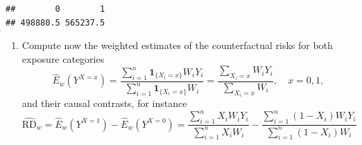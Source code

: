 \documentclass[
]{book}
\newenvironment{Shaded}{\begin{snugshade}}{\end{snugshade}}
\newcommand{\DecValTok}[1]{\textcolor[rgb]{0.00,0.00,0.81}{#1}}
\newcommand{\FunctionTok}[1]{\textcolor[rgb]{0.13,0.29,0.53}{\textbf{#1}}}
\newcommand{\NormalTok}[1]{#1}
\newcommand{\OtherTok}[1]{\textcolor[rgb]{0.56,0.35,0.01}{#1}}
\newcommand{\SpecialCharTok}[1]{\textcolor[rgb]{0.81,0.36,0.00}{\textbf{#1}}}
\providecommand{\tightlist}{%
  \setlength{\itemsep}{0pt}\setlength{\parskip}{0pt}}
\begin{document}
\begin{Shaded}
\end{Shaded}

\begin{verbatim}
##        0        1 
## 498880.5 565237.5
\end{verbatim}

\begin{enumerate}
\def\labelenumi{\arabic{enumi}.}
\setcounter{enumi}{3}
\tightlist
\item
  Compute now the weighted estimates of the counterfactual risks for
  both exposure categories \[ \widehat{E}_w(Y^{X = x}) =
  \frac{ \sum_{i=1}^n {\mathbf 1}_{ \{X_i=x\} } W_i Y_i }
     {\sum_{i=1}^n {\mathbf 1}_{ \{X_i=x\} }W_i} =
   \frac{ \sum_{X_i = x} W_i Y_i }{\sum_{X_i=x} W_i}, \quad x = 0,1, \]
  and their causal contrasts, for instance
  \[ \widehat{\text{RD}}_{w} = \widehat{E}_w(Y^{X = 1}) -
                \widehat{E}_w(Y^{X = 0})
   =   \frac{ \sum_{i=1}^n X_i W_i Y_i }{\sum_{i=1}^n X_i W_i} -
      \frac{ \sum_{i=1}^n (1-X_i) W_i Y_i }{\sum_{i=1}^n (1-X_i) W_i}
  \]
\end{enumerate}

\begin{Shaded}
\end{Shaded}
\end{document}
